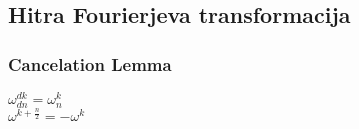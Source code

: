 \documentclass{article}
\begin{document}
\begin{multicols}{2}
	\subsection{Hitra Fourierjeva transformacija}

	\subsubsection{Cancelation Lemma}

	\begin{center}
		\begin{math}
			\omega^{dk}_{dn} = \omega^{k}_{n}
		\end{math} \\
		\begin{math}
			\omega^{k + \frac{n}{2}} = -\omega^{k}
		\end{math}
	\end{center}

\end{multicols}
\end{document}
